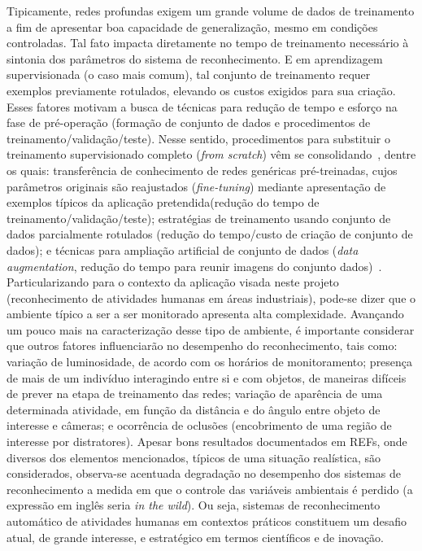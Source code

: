  Tipicamente, redes profundas exigem um grande volume de dados de treinamento a fim de apresentar boa capacidade de generalização, mesmo em condições controladas. Tal fato impacta diretamente no tempo de treinamento necessário à sintonia dos parâmetros do sistema de reconhecimento. E em aprendizagem supervisionada (o caso mais comum), tal conjunto de treinamento requer exemplos previamente rotulados, elevando os custos exigidos para sua criação. Esses fatores motivam a busca de técnicas para redução de tempo e esforço na fase de pré-operação (formação de conjunto de dados e procedimentos de treinamento/validação/teste). Nesse sentido, procedimentos para  substituir o treinamento supervisionado completo (\emph{from scratch}) vêm se consolidando~\parencite{herath-2017}, dentre os quais: transferência de conhecimento de redes genéricas pré-treinadas, cujos parâmetros originais são reajustados  (\emph{fine-tuning}) mediante apresentação de exemplos típicos da aplicação pretendida(redução do tempo de treinamento/validação/teste); estratégias de treinamento usando conjunto de dados parcialmente rotulados (redução do tempo/custo de criação de conjunto de dados); e técnicas para ampliação artificial de conjunto de dados (\emph{data augmentation}, redução do tempo para reunir imagens do conjunto dados)~\parencite{wang-2015}.
% 
%
Particularizando para o contexto da aplicação visada neste projeto (reconhecimento de atividades humanas em áreas industriais), pode-se dizer que o ambiente típico a ser a ser monitorado apresenta alta complexidade. Avançando um pouco mais na caracterização desse tipo de ambiente, é importante considerar que outros fatores influenciarão no desempenho do reconhecimento, tais como: variação de luminosidade, de acordo com os horários de monitoramento; presença de mais de um indivíduo interagindo entre si e com objetos, de maneiras difíceis de prever na etapa de treinamento das redes; variação de aparência de uma determinada atividade, em função da distância e do ângulo entre objeto de interesse e câmeras; e ocorrência de oclusões (encobrimento de uma região de interesse por distratores).
%
Apesar bons resultados documentados em REFs, onde diversos dos elementos mencionados, típicos de uma situação realística, são considerados, observa-se acentuada degradação no desempenho dos sistemas de reconhecimento a medida em que o controle das variáveis ambientais é perdido (a expressão em inglês seria \emph{in the wild}). Ou seja, sistemas de reconhecimento automático de atividades humanas em contextos práticos constituem um desafio atual, de grande interesse, e estratégico em termos científicos e de inovação.
